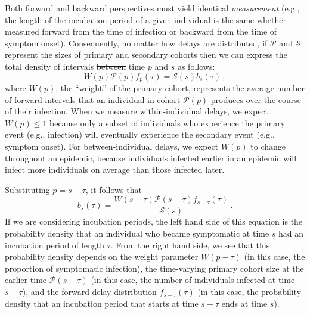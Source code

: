 \documentclass[12pt]{article}
\newcommand{\psymp}{\ensuremath{p}} %
\newcommand{\ssymp}{\ensuremath{s}} %
\newcommand{\psize}{{\mathcal P}} %
\newcommand{\ssize}{{\mathcal S}} %
\providecommand{\DIFaddtex}[1]{{\protect\color{blue}\uwave{#1}}} %
\providecommand{\DIFdeltex}[1]{{\protect\color{red}\sout{#1}}}                      %
\providecommand{\DIFaddbegin}{} %
\providecommand{\DIFaddend}{} %
\providecommand{\DIFdelbegin}{} %
\providecommand{\DIFdelend}{} %
\providecommand{\DIFadd}[1]{\texorpdfstring{\DIFaddtex{#1}}{#1}} %
\providecommand{\DIFdel}[1]{\texorpdfstring{\DIFdeltex{#1}}{}} %
\newcommand{\DIFscaledelfig}{0.5}
\newlength{\DIFdelgraphicswidth} %
\newlength{\DIFdelgraphicsheight} %
\newcommand{\DIFaddincludegraphics}[2][]{{\color{blue}\fbox{\DIFOincludegraphics[#1]{#2}}}} %
\newcommand{\DIFdelincludegraphics}[2][]{%
\sbox{\DIFdelgraphicsbox}{\DIFOincludegraphics[#1]{#2}}%
\settoboxwidth{\DIFdelgraphicswidth}{\DIFdelgraphicsbox} %
\settoboxtotalheight{\DIFdelgraphicsheight}{\DIFdelgraphicsbox} %
\scalebox{\DIFscaledelfig}{%
\parbox[b]{\DIFdelgraphicswidth}{\usebox{\DIFdelgraphicsbox}\\[-\baselineskip] \rule{\DIFdelgraphicswidth}{0em}}\llap{\resizebox{\DIFdelgraphicswidth}{\DIFdelgraphicsheight}{%
\setlength{\unitlength}{\DIFdelgraphicswidth}%
\begin{picture}(1,1)%
\thicklines\linethickness{2pt} %
{\color[rgb]{1,0,0}\put(0,0){\framebox(1,1){}}}%
{\color[rgb]{1,0,0}\put(0,0){\line( 1,1){1}}}%
{\color[rgb]{1,0,0}\put(0,1){\line(1,-1){1}}}%
\end{picture}%
}\hspace*{3pt}}} %
} %
\DeclareRobustCommand{\DIFaddbegin}{\DIFOaddbegin \let\includegraphics\DIFaddincludegraphics} %
\DeclareRobustCommand{\DIFaddend}{\DIFOaddend \let\includegraphics\DIFOincludegraphics} %
\DeclareRobustCommand{\DIFdelbegin}{\DIFOdelbegin \let\includegraphics\DIFdelincludegraphics} %
\DeclareRobustCommand{\DIFdelend}{\DIFOaddend \let\includegraphics\DIFOincludegraphics} %
\begin{document}
Both forward and backward perspectives
must yield identical \emph{measurement} (e.g., the length of the incubation
period of a given individual is the same whether measured forward from
the time of infection or backward from the time of symptom onset).
Consequently, no matter how delays are distributed, if
$\mathcal P$ and $\mathcal S$ represent the sizes of primary and
secondary cohorts then we can express the total density of intervals \DIFdelbegin \DIFdel{between }\DIFdelend \DIFaddbegin \DIFadd{$\tau$ between calendar }\DIFaddend time $\psymp$ and $\ssymp$ \DIFaddbegin \DIFadd{(i.e., $\tau=\ssymp-\psymp$) }\DIFaddend as follows:
\begin{equation}
W(\psymp) \psize(\psymp) f_\psymp(\tau) = \ssize(\ssymp) b_\ssymp(\tau) \,,
\label{eq:match}
\end{equation}
where $W(\psymp)$, the ``weight'' of the primary cohort, represents the average number of forward intervals that an individual in cohort $\psize(\psymp)$ produces over the course of their infection.
When we measure within-individual delays, we expect $W(\psymp) \leq 1$ because only a subset of individuals who experience the primary event (e.g., infection) will eventually experience the secondary event (e.g., symptom onset).
For between-individual delays, we expect $W(\psymp)$ to change throughout an epidemic, because individuals infected earlier in an epidemic will infect more individuals on average than those infected later.

Substituting $\psymp=\ssymp-\tau$, it follows that
\begin{equation}
b_\ssymp(\tau)= \frac{W(\ssymp-\tau) \psize(\ssymp-\tau) f_{\ssymp-\tau} (\tau)}{\ssize(\ssymp)}\,.
\label{eq:backward}
\end{equation}
If we are considering incubation periods, the left hand side of
this equation is the probability density that an individual
who became symptomatic at time $\ssymp$ had an incubation period of
length $\tau$.
From the right hand side, we see that this probability density depends on the weight parameter \DIFdelbegin \DIFdel{$W(\psymp-\tau)$ }\DIFdelend \DIFaddbegin \DIFadd{$W(\ssymp-\tau)$ }\DIFaddend (in this case, the proportion of symptomatic infection),
the time-varying primary cohort size at the earlier time $\psize(\ssymp-\tau)$ (in this case, the number of individuals infected at time $\ssymp-\tau$),
and the forward delay distribution $f_{\ssymp-\tau}(\tau)$ (in this case, the probability density that an incubation period that starts at time $\ssymp-\tau$ ends at time $\ssymp$).
\end{document}
